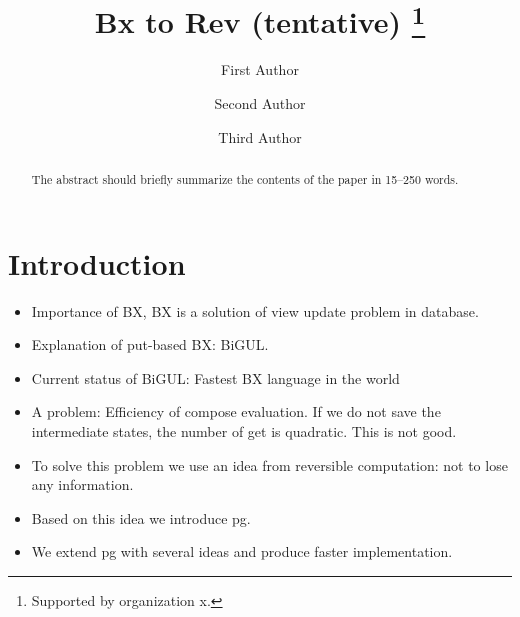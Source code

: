 \documentclass[runningheads]{llncs}
\begin{document}
%
\title{Bx to Rev (tentative) \thanks{Supported by organization x.}}
%
%
\author{First Author \and
Second Author \and
Third Author}
%
%
%
\maketitle              %
%
\begin{abstract}
The abstract should briefly summarize the contents of the paper in
15--250 words.

\end{abstract}
%
%
%
\section{Introduction}



\begin{itemize}
\item Importance of BX, BX is a solution of view update problem in database.
\item Explanation of put-based BX: BiGUL.
\item Current status of BiGUL: Fastest BX language in the world
\item A problem: Efficiency of compose evaluation. If we do not save the intermediate states, the number of get is quadratic. This is not good.
\item To solve this problem we use an idea from reversible computation: not to lose any information.
\item Based on this idea we introduce pg.
\item We extend pg with several ideas and produce faster implementation.
\end{itemize}
\end{document}
